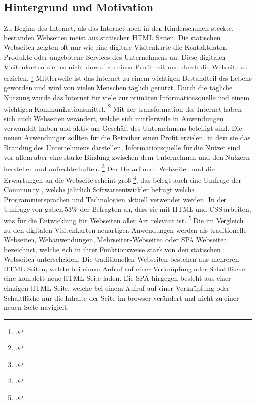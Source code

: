 \subsection{Hintergrund und Motivation}
Zu Beginn des Internet, als das Internet noch in den Kinderschuhen steckte, bestanden Webseiten meist aus statischen \ac{HTML} Seiten.
Die statischen Webseiten zeigten oft nur wie eine digitale Visitenkarte die Kontaktdaten, Produkte oder angebotene Services des Unternehmens an.
Diese digitalen Visitenkarten zielten nicht darauf ab einen Profit mit und durch die Webseite zu erzielen. \footcite[Vgl.][Seite 1]{Bly2018}
Mittlerweile ist das Internet zu einem wichtigen Bestandteil des Lebens geworden und wird von vielen Menschen täglich genutzt.
Durch die tägliche Nutzung wurde das Internet für viele zur primären Informationsquelle und einem wichtigen Kommunikationsmittel. \footcite[Vgl.][Seite 1]{conf/pi/Sassenberg}
Mit der transformation des Internet haben sich auch Webseiten verändert, welche sich mittlerweile in Anwendungen verwandelt haben und aktiv am Geschäft des Unternehmens beteiligt sind.
Die neuen Anwendungen sollten für die Betreiber einen Profit erzielen, in dem sie das Branding des Unternehmens darstellen, Informationsquelle für die Nutzer sind vor allem aber eine starke Bindung zwischen dem Unternehmen und den Nutzern herstellen und aufrechterhalten. \footcite[Vgl.][Seite 1]{Bly2018}
Der Bedarf nach Webseiten und die Erwartungen an die Webseite scheint groß \footcite[Vgl.][Seite 1]{Smith2022}, das belegt auch eine Umfrage der Community , welche jährlich Softwareentwickler befragt welche Programmiersprachen und Technologien aktuell verwendet werden.
In der Umfrage von  gaben  53\% der Befragten an, dass sie mit \ac{HTML} und \ac{CSS} arbeiten, was für die Entwicklung für Webseiten aller Art relevant ist. \footcite[Vgl.][most-popular-technologies-programming-scripting-and-markup-languages]{StackOverflow2023}
Die im Vergleich zu den digitalen Visitenkarten neuartigen Anwendungen werden als traditionelle Webseiten, Webanwendungen, Mehrseiten-Webseiten oder \ac{SPA} Webseiten bezeichnet, welche sich in ihrer Funktionsweise stark von den statischen Webseiten unterscheiden.
Die traditionellen Webseiten bestehen aus mehreren \ac{HTML} Seiten, welche bei einem Aufruf auf einer Verknüpfung oder Schaltfläche eine komplett neue \ac{HTML} Seite laden.
Die \ac{SPA} hingegen besteht aus einer einzigen \ac{HTML} Seite, welche bei einem Aufruf auf einer Verknüpfung oder Schaltfläche nur die Inhalte der Seite im \gls{browser} verändert und nicht zu einer neuen Seite navigiert.
